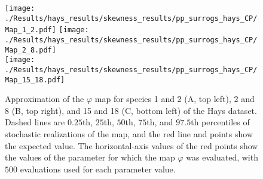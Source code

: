 \documentclass[letterpaper,11pt]{article}
\begin{document}





\begin{figure}
\texttt{[image: ./Results/hays\_results/skewness\_results/pp\_surrogs\_hays\_CP/Map\_1\_2.pdf]} 
\texttt{[image: ./Results/hays\_results/skewness\_results/pp\_surrogs\_hays\_CP/Map\_2\_8.pdf]} \\
\texttt{[image: ./Results/hays\_results/skewness\_results/pp\_surrogs\_hays\_CP/Map\_15\_18.pdf]}
\caption{Approximation of the $\varphi$ map for species 1 and 2 (A, top left), 2 and 8 (B, top right), and 15 and 18 (C, bottom left) 
of the Hays dataset. Dashed lines are $0.25$th, $25$th, $50$th, $75$th, and $97.5$th percentiles 
of stochastic realizations of the map, and
the red line and points show the expected value. The horizontal-axis values of the red 
points show the values of the
parameter for which the map $\varphi$ was evaluated, with $500$ evaluations used for
each parameter value.}\label{fig:varphiexample}
\end{figure}
\end{document}
